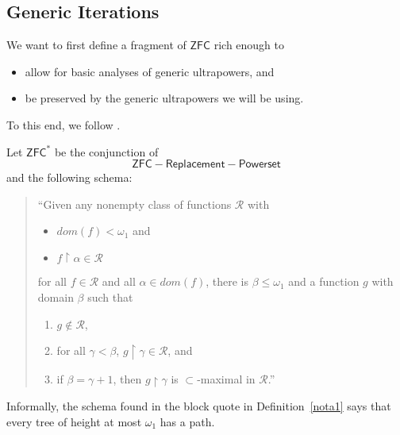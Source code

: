 \documentclass[12pt]{article}
\numberwithin{equation}{section}
\begin{document}
\subsection{Generic Iterations}

We want to first define a fragment of $\mathsf{ZFC}$ rich enough to 
\begin{itemize}
    \item allow for basic analyses of generic ultrapowers, and
    \item be preserved by the generic ultrapowers we will be using.
\end{itemize}
To this end, we follow \cite[Section 3.1]{woodin}.

\begin{defi}[Woodin]\label{nota1}
Let $\mathsf{ZFC}^*$ be the conjunction of $$\mathsf{ZFC} - \mathsf{Replacement} - \mathsf{Powerset}$$ and the following schema:
\begin{quote}
    ``Given any nonempty class of functions $\mathcal{R}$ with
    \begin{itemize}
        \item $dom(f) < \omega_1$ and
        \item $f \restriction \alpha \in \mathcal{R}$
    \end{itemize}
    for all $f \in \mathcal{R}$ and all $\alpha \in dom(f)$, there is $\beta \leq \omega_1$ and a function $g$ with domain $\beta$ such that
    \begin{enumerate}[label=(\alph*)]
        \item $g \not \in \mathcal{R}$,
        \item for all $\gamma < \beta$, $g \restriction \gamma \in \mathcal{R}$, and
        \item if $\beta = \gamma + 1$, then $g \restriction \gamma$ is $\subset$-maximal in $\mathcal{R}$.''
    \end{enumerate}
\end{quote}
\end{defi}

Informally, the schema found in the block quote in Definition~\ref{nota1} says that every tree of height at most $\omega_1$ has a path.
\end{document}

